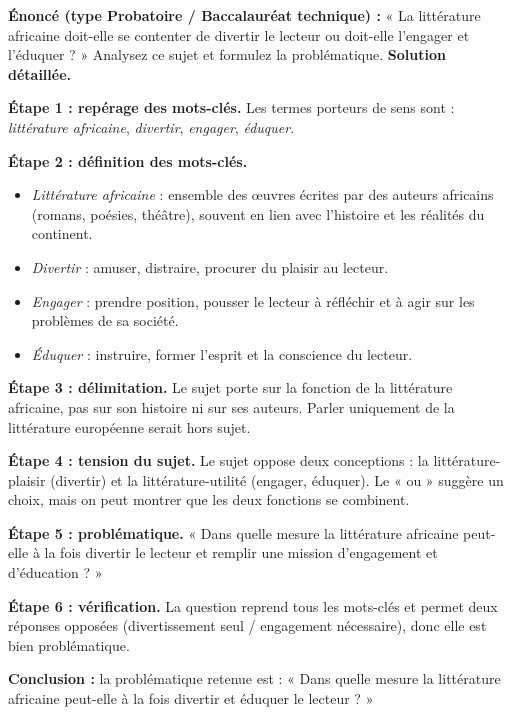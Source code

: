 \documentclass[11pt]{article}
\newcommand{\cle}[1]{{\popxbold\color{popdark}#1}}
\begin{document}
\begin{exoresolu}
\textbf{Énoncé (type Probatoire / Baccalauréat technique) :} « La littérature africaine doit-elle se contenter de divertir le lecteur ou doit-elle l'engager et l'éduquer ? » Analysez ce sujet et formulez la problématique.
\tcblower
\textbf{Solution détaillée.}

\textbf{Étape 1 : repérage des mots-clés.} Les termes porteurs de sens sont : \emph{littérature africaine}, \emph{divertir}, \emph{engager}, \emph{éduquer}.

\textbf{Étape 2 : définition des mots-clés.}
\begin{itemize}
\item \emph{Littérature africaine} : ensemble des œuvres écrites par des auteurs africains (romans, poésies, théâtre), souvent en lien avec l'histoire et les réalités du continent.
\item \emph{Divertir} : amuser, distraire, procurer du plaisir au lecteur.
\item \emph{Engager} : prendre position, pousser le lecteur à réfléchir et à agir sur les problèmes de sa société.
\item \emph{Éduquer} : instruire, former l'esprit et la conscience du lecteur.
\end{itemize}

\textbf{Étape 3 : délimitation.} Le sujet porte sur la \cle{fonction} de la littérature africaine, pas sur son histoire ni sur ses auteurs. Parler uniquement de la littérature européenne serait hors sujet.

\textbf{Étape 4 : tension du sujet.} Le sujet oppose deux conceptions : la littérature-plaisir (divertir) et la littérature-utilité (engager, éduquer). Le « ou » suggère un choix, mais on peut montrer que les deux fonctions se combinent.

\textbf{Étape 5 : problématique.} « Dans quelle mesure la littérature africaine peut-elle à la fois divertir le lecteur et remplir une mission d'engagement et d'éducation ? »

\textbf{Étape 6 : vérification.} La question reprend tous les mots-clés et permet deux réponses opposées (divertissement seul / engagement nécessaire), donc elle est bien problématique.

\textbf{Conclusion :} la problématique retenue est : « Dans quelle mesure la littérature africaine peut-elle à la fois divertir et éduquer le lecteur ? »
\end{exoresolu}
\end{document}
